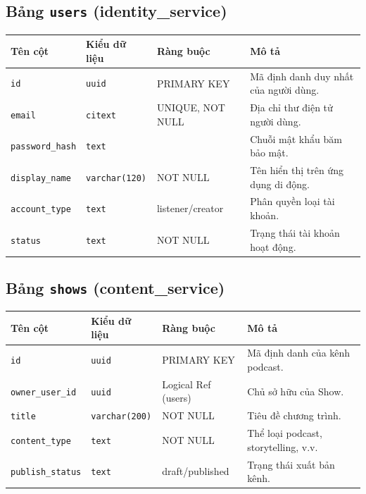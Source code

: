 \documentclass[12pt,a4paper]{report}
\begin{document}
\subsection{Bảng \texttt{users} (identity\_service)}
\begin{table}[h!]
\centering
\begin{tabular}{llp{2.5cm}p{6.5cm}}
\toprule
\textbf{Tên cột} & \textbf{Kiểu dữ liệu} & \textbf{Ràng buộc} & \textbf{Mô tả} \\
\midrule
\texttt{id} & \texttt{uuid} & PRIMARY KEY & Mã định danh duy nhất của người dùng. \\
\texttt{email} & \texttt{citext} & UNIQUE, NOT NULL & Địa chỉ thư điện tử người dùng. \\
\texttt{password\_hash} & \texttt{text} & & Chuỗi mật khẩu băm bảo mật. \\
\texttt{display\_name} & \texttt{varchar(120)} & NOT NULL & Tên hiển thị trên ứng dụng di động. \\
\texttt{account\_type} & \texttt{text} & listener/creator & Phân quyền loại tài khoản. \\
\texttt{status} & \texttt{text} & NOT NULL & Trạng thái tài khoản hoạt động. \\
\bottomrule
\end{tabular}
\end{table}

\subsection{Bảng \texttt{shows} (content\_service)}
\begin{table}[h!]
\centering
\begin{tabular}{llp{2.5cm}p{6.5cm}}
\toprule
\textbf{Tên cột} & \textbf{Kiểu dữ liệu} & \textbf{Ràng buộc} & \textbf{Mô tả} \\
\midrule
\texttt{id} & \texttt{uuid} & PRIMARY KEY & Mã định danh của kênh podcast. \\
\texttt{owner\_user\_id} & \texttt{uuid} & Logical Ref (users) & Chủ sở hữu của Show. \\
\texttt{title} & \texttt{varchar(200)} & NOT NULL & Tiêu đề chương trình. \\
\texttt{content\_type} & \texttt{text} & NOT NULL & Thể loại podcast, storytelling, v.v. \\
\texttt{publish\_status} & \texttt{text} & draft/published & Trạng thái xuất bản kênh. \\
\bottomrule
\end{tabular}
\end{table}
\end{document}
